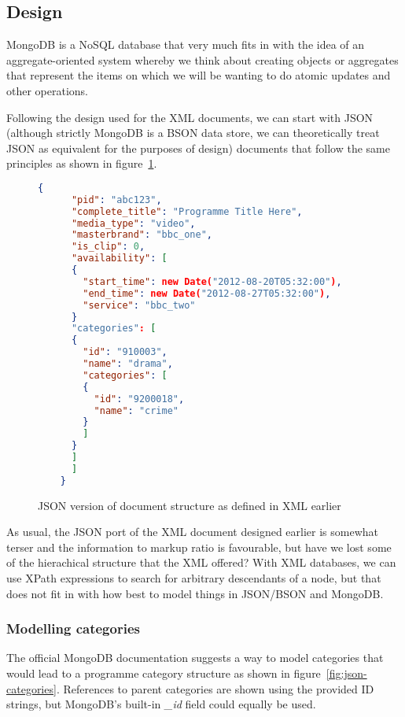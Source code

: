 \documentclass[11pt,a4paper]{article}
\begin{document}
\subsection{Design}

MongoDB is a NoSQL database that very much fits in with the idea of
an aggregate-oriented system whereby we think about creating objects
or aggregates that represent the items on which we will be wanting
to do atomic updates and other operations.

Following the design used for the XML documents, we can start with
JSON (although strictly MongoDB is a BSON data store, we can theoretically
treat JSON as equivalent for the purposes of design)
documents that follow the same principles as shown in figure~\ref{fig:big-json-doc}.

\begin{figure}[p]
  \begin{lstlisting}[language=json]
    {
      "pid": "abc123",
      "complete_title": "Programme Title Here",
      "media_type": "video",
      "masterbrand": "bbc_one",
      "is_clip": 0,
      "availability": [
      {
        "start_time": new Date("2012-08-20T05:32:00"),
        "end_time": new Date("2012-08-27T05:32:00"),
        "service": "bbc_two"
      }
      "categories": [
      {
        "id": "910003",
        "name": "drama",
        "categories": [
        {
          "id": "9200018",
          "name": "crime"
        }
        ]
      }
      ]
      ]
    }
  \end{lstlisting}
  \caption{JSON version of document structure as defined in XML earlier}
  \label{fig:big-json-doc}
\end{figure}

As usual, the JSON port of the XML document designed earlier is somewhat
terser and the information to markup ratio is favourable, but have we
lost some of the hierachical structure that the XML offered? With
XML databases, we can use XPath expressions to search for arbitrary
descendants of a node, but that does not fit in with how best
to model things in JSON/BSON and MongoDB.

\subsubsection{Modelling categories}
\label{sec:mongo-design-categories}

The official MongoDB documentation\cite{mongo-categories} suggests
a way to model categories that would lead to a programme category
structure as shown in figure~\ref{fig:json-categories}. References
to parent categories are shown using the provided ID strings, but
MongoDB's built-in \emph{\_id} field could equally be used.
\end{document}
